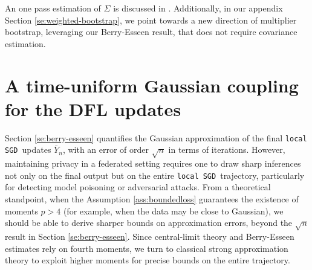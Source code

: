 \documentclass[a4paper,11pt]{article}
\numberwithin{equation}{section}
\theoremstyle{plain}
\theoremstyle{remark}
\newcommand{\DFL}{\texttt{local SGD}}
\begin{document}
 \noindent
 An one pass estimation of $\Sigma$ is discussed in \cite{songxichen2024}. Additionally, in our appendix Section \ref{se:weighted-bootstrap}, we point towards a new direction of multiplier bootstrap, leveraging our Berry-Esseen result, that does not require covariance estimation. 

\section{A time-uniform Gaussian coupling for the DFL updates} \label{se:kmt}
Section \ref{se:berry-esseen} quantifies the Gaussian approximation of the final \DFL\ updates $\bar{Y}_n$, with an error of order $\sqrt{n}$ in terms of iterations. However, maintaining privacy in a federated setting requires one to draw sharp inferences not only on the final output but on the entire \DFL\ trajectory, particularly for detecting model poisoning or adversarial attacks. From a theoretical standpoint, when the Assumption \ref{ass:boundedloss} guarantees the existence of moments $p>4$ (for example, when the data may be close to Gaussian), we should be able to derive sharper bounds on approximation errors, beyond the $\sqrt{n}$ result in Section \ref{se:berry-esseen}. Since central-limit theory and Berry-Esseen estimates rely on fourth moments, we turn to classical strong approximation theory to exploit higher moments for precise bounds on the entire trajectory.
\end{document}
